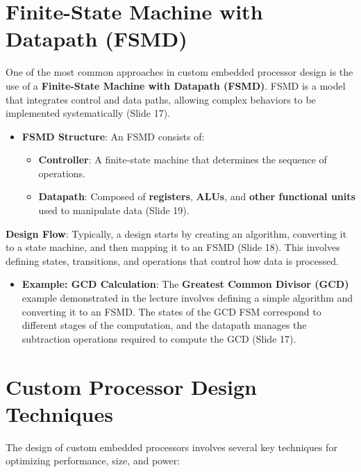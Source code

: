 \documentclass[
  14pt,
  a4paper,
  numbers=noendperiod,
  headinclude=true,
  footinclude=true,
  DIV=calc]{scrreprt}
\providecommand{\tightlist}{%
  \setlength{\itemsep}{0pt}\setlength{\parskip}{0pt}}\usepackage{longtable,booktabs,array}
\begin{document}
\section{Finite-State Machine with Datapath
(FSMD)}\label{finite-state-machine-with-datapath-fsmd}

One of the most common approaches in custom embedded processor design is
the use of a \textbf{Finite-State Machine with Datapath (FSMD)}. FSMD is
a model that integrates control and data paths, allowing complex
behaviors to be implemented systematically (Slide 17).

\begin{itemize}
\item
  \textbf{FSMD Structure}: An FSMD consists of:

  \begin{itemize}
  \item
    \textbf{Controller}: A finite-state machine that determines the
    sequence of operations.
  \item
    \textbf{Datapath}: Composed of \textbf{registers}, \textbf{ALUs},
    and \textbf{other functional units} used to manipulate data (Slide
    19).
  \end{itemize}
\end{itemize}

\textbf{Design Flow}: Typically, a design starts by creating an
algorithm, converting it to a state machine, and then mapping it to an
FSMD (Slide 18). This involves defining states, transitions, and
operations that control how data is processed.

\begin{itemize}
\tightlist
\item
  \textbf{Example: GCD Calculation}: The \textbf{Greatest Common Divisor
  (GCD)} example demonstrated in the lecture involves defining a simple
  algorithm and converting it to an FSMD. The states of the GCD FSM
  correspond to different stages of the computation, and the datapath
  manages the subtraction operations required to compute the GCD (Slide
  17).
\end{itemize}

\section{Custom Processor Design
Techniques}\label{custom-processor-design-techniques}

The design of custom embedded processors involves several key techniques
for optimizing performance, size, and power:
\end{document}
